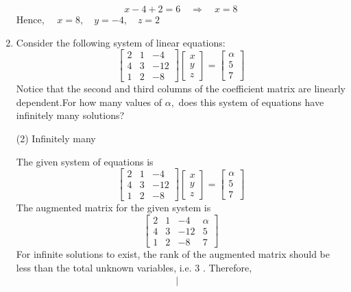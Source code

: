 \begin{enumerate}[label=\color{ocre}\textbf{\arabic*.}]
\begin{answer}
$$
x-4+2=6 \quad \Rightarrow \quad x=8
$$
Hence, $\quad x=8, \quad y=-4, \quad z=2$
\end{answer}
\item Consider the following system of linear equations:
$$
\left[\begin{array}{rrr}
2 & 1 & -4 \\
4 & 3 & -12 \\
1 & 2 & -8
\end{array}\right]\left[\begin{array}{l}
x \\
y \\
z
\end{array}\right]=\left[\begin{array}{l}
\alpha \\
5 \\
7
\end{array}\right]
$$
Notice that the second and third columns of the
coefficient matrix are linearly dependent.For how many values of $\alpha,$ does this system of equations have infinitely many solutions?
\begin{tasks}(2)
	\task[\textbf{d.}]Infinitely many 
\end{tasks}
\begin{answer}
 The given system of equations is
$$
\left[\begin{array}{rrr}
2 & 1 & -4 \\
4 & 3 & -12 \\
1 & 2 & -8
\end{array}\right]\left[\begin{array}{l}
x \\
y \\
z
\end{array}\right]=\left[\begin{array}{l}
\alpha \\
5 \\
7
\end{array}\right]
$$
The augmented matrix for the given system is
$$
\left[\begin{array}{rrr|r}
2 & 1 & -4 & \alpha \\
4 & 3 & -12 & 5 \\
1 & 2 & -8 & 7
\end{array}\right]
$$
For infinite solutions to exist, the rank of the augmented matrix should be less than the total unknown variables, i.e. 3 . Therefore,
$$
\begin{array}{l}
\left|\begin{array}{lll}

\end{array}
\end{array}$$
\end{answer}
\end{enumerate}
